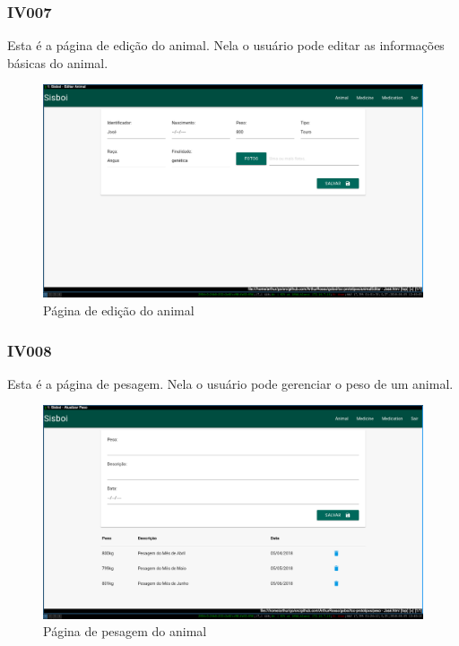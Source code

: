 \documentclass[12pt]{article}
\begin{document}
\newpage
\subsubsection{IV007}

Esta é a página de edição do animal. Nela o usuário pode editar as informações básicas do animal.
\begin{figure}[!h]
	\begin{center}
		\caption{Página de edição do animal}
		\includegraphics[width=13cm]{img/prototipos/editar.png}


	\end{center}
\end{figure}

\subsubsection{IV008}

Esta é a página de pesagem. Nela o usuário pode gerenciar o peso de um animal.
\begin{figure}[!h]
	\begin{center}
		\caption{Página de pesagem do animal}
		\includegraphics[width=13cm]{img/prototipos/peso.png}


	\end{center}
\end{figure}
\end{document}
